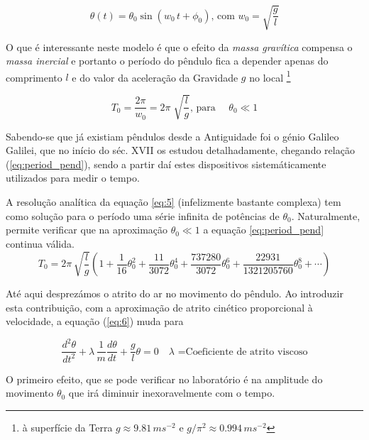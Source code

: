 \documentclass[a4paper,twoside,12pt]{article}      %
\begin{document}
\begin{equation}
	\label{eq:solu_pend}
\theta (t) = \theta_0 \sin(w_0 \, t + \phi_0) \text{, com } w_0 = \sqrt{\frac{g}{l}}
\end{equation}

O que é interessante neste modelo é que o efeito da \emph{massa gravítica } compensa o \emph{massa inercial } e portanto o período do pêndulo fica a  depender apenas do comprimento $l$  e do valor da aceleração da Gravidade $g$ no local \footnote{à superfície da Terra $g\approx 9.81\,m s^{-2}$ e $g/\pi^2 \approx 0.994 \,m s^{-2}$}

\begin{equation}
	\label{eq:period_pend}
T_0 = \frac{2 \pi}{w_0} = 2\pi\; \sqrt{\frac{l}{g}} \text{, para }	\quad \theta_0 \ll 1
\end{equation}

Sabendo-se que já existiam pêndulos  desde a Antiguidade foi o génio  Galileo Galilei, que no início do séc. XVII os estudou detalhadamente, chegando relação (\ref{eq:period_pend}), sendo a partir daí 
estes dispositivos sistemáticamente utilizados para medir o tempo.

A resolução analítica da equação 	\ref{eq:5} (infelizmente bastante complexa) tem como solução para o período uma série  infinita de potências de $\theta_0$. 
Naturalmente, permite verificar que na aproximação $\theta_0 \ll 1$ a equação \ref{eq:period_pend} continua válida.
\begin{equation}
	\label{eq:period_pend_exa}
T_0 =  2\pi\, \sqrt{\frac{l}{g}} \left(1 + \frac{1}{16} \theta_0^{2} + \frac{11}{3072} \theta_0^{4} +
 \frac{737280}{3072} \theta_0^{6} + \frac{22931}{1321205760} \theta_0^{8} + \cdots \right)
\end{equation}

Até aqui desprezámos o atrito do ar no movimento do pêndulo. Ao introduzir esta contribuição, com a aproximação de atrito cinético 
proporcional à velocidade, a  equação	(\ref{eq:6}) muda para

\begin{equation}
	 \frac{d^2 \theta}{dt^2} + \lambda \, \frac{1}{m}  \frac{d \theta}{dt} + \frac{g}{l} \theta =0 \quad \lambda \text{ =Coeficiente de atrito viscoso}
\end{equation}

O primeiro efeito, que se pode verificar no laboratório é na amplitude do movimento $\theta_0$ que irá diminuir inexoravelmente com o tempo. 
\end{document}
